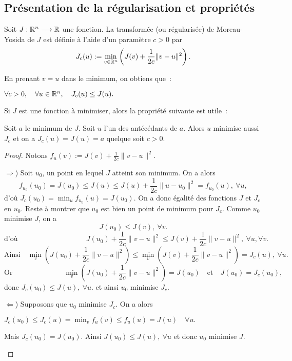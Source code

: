 \documentclass[main.tex]{subfiles}
\begin{document}
\subsection{Présentation de la régularisation et propriétés}
\begin{dfn}\label{dfn:moreau_yosida}
Soit $J : \mathbb{R}^n \longrightarrow \mathbb{R}$ une fonction. La transformée (ou régularisée) de Moreau-Yosida de $J$ est définie à l'aide d'un paramètre $c>0$ par
\begin{equation}
J_c(u) := \min_{v\in \mathbb{R}^n} \left( J(v) + \frac{1}{2c} \|v-u\|^2 \right).
\end{equation}
\end{dfn}
\noindent En prenant $v=u$ dans le minimum, on obtiens que~:
\begin{prop}
$\forall c>0, \quad \forall u \in \mathbb{R}^n, \quad J_c(u) \leq J(u) .$
\end{prop}
\noindent Si $J$ est une fonction à minimiser, alors la propriété suivante est utile~:
\begin{prop}
Soit $a$ le minimum de $J$. Soit $u$ l'un des antécédants de $a$. Alors $u$ minimise aussi $J_c$ et on a $J_c(u)=J(u)=a$ quelque soit $c>0$.
\end{prop}
\begin{proof}Notons $f_u(v) := J(v) + \frac{1}{2c} \| v-u \|^2$.
\begin{myitemize}
\item[$\Rightarrow$)] Soit $u_0$, un point en lequel $J$ atteint son minimum. On a alors $$f_{u_0}(u_0) = J(u_0)\leq J(u) \leq J(u) + \frac{1}{2c} \| u-u_0 \|^2  = f_{u_0}(u), \ \forall u, $$
d'où $J_c(u_0) = \min_u f_{u_0}(u) = J(u_0) $. On a donc égalité des fonctions $J$ et $J_c$ en $u_0$. Reste à montrer que $u_0$ est bien un point de minimum pour $J_c$. Comme $u_0$ minimise $J$, on a $$J(u_0)\leq J(v), \ \forall v.$$
$$\text{d'où} \hspace{4cm} J(u_0) + \frac{1}{2c}\|v-u\|^2 \leq J(v) + \frac{1}{2c}\| v-u \|^2, \ \forall u, \forall v.$$
$$\text{Ainsi} \quad \min_v \left( J(u_0) + \frac{1}{2c}\|v-u\|^2 \right) \leq \min_v \left( J(v) + \frac{1}{2c}\| v-u \|^2 \right)=J_c(u), \ \forall u.$$
$$\text{Or} \hspace{3cm} \min_v \left( J(u_0) + \frac{1}{2c}\|v-u\|^2 \right)=J(u_0) \quad \text{et} \quad  J(u_0)=J_c(u_0),$$ 
donc $J_c(u_0) \leq J(u), \ \forall u $.
et ainsi $u_0$ minimise $J_c$.
\item[$\Leftarrow$)] Supposons que $u_0$ minimise $J_c$. On a alors
\begin{center}
$J_c(u_0) \leq J_c(u) = \min_v f_u(v) \leq f_u(u) = J(u) \quad \forall u.$
\end{center}
Mais $J_c(u_0) = J(u_0)$. Ainsi $J(u_0) \leq J(u), \ \forall u$ 
et donc $u_0$ minimise $J$.
\end{myitemize}
\end{proof}
\end{document}

